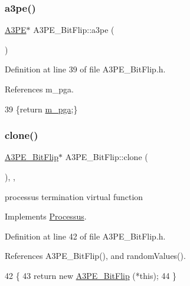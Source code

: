 \subsubsection{\texorpdfstring{a3pe()}{a3pe()}}
{\footnotesize\ttfamily \hyperlink{classA3PE}{A3\+PE}$\ast$ A3\+P\+E\+\_\+\+Bit\+Flip\+::a3pe (\begin{DoxyParamCaption}{ }\end{DoxyParamCaption})\hspace{0.3cm}{\ttfamily [inline]}}



Definition at line 39 of file A3\+P\+E\+\_\+\+Bit\+Flip.\+h.



References m\+\_\+pga.


\begin{DoxyCode}
39 \{\textcolor{keywordflow}{return} \hyperlink{classA3PE__BitFlip_ad20d7abccf27fa87b931cb77cd6b5e41}{m\_pga};\}
\end{DoxyCode}
\mbox{\label{classA3PE__BitFlip_a444f2b4fd5211e457105f13d19795211}} 
\subsubsection{\texorpdfstring{clone()}{clone()}}
{\footnotesize\ttfamily \hyperlink{classA3PE__BitFlip_1_1A3PE__BitFlip}{A3\+P\+E\+\_\+\+Bit\+Flip}$\ast$ A3\+P\+E\+\_\+\+Bit\+Flip\+::clone (\begin{DoxyParamCaption}{ }\end{DoxyParamCaption})\hspace{0.3cm}{\ttfamily [inline]}, {\ttfamily [protected]}, {\ttfamily [virtual]}}

processus termination virtual function 

Implements \hyperlink{classProcessus_aca8856f6d6d7b7e1fe941f298dcbb502}{Processus}.



Definition at line 42 of file A3\+P\+E\+\_\+\+Bit\+Flip.\+h.



References A3\+P\+E\+\_\+\+Bit\+Flip(), and random\+Values().


\begin{DoxyCode}
42                        \{
43     \textcolor{keywordflow}{return} \textcolor{keyword}{new} \hyperlink{classA3PE__BitFlip_a79aca0cefbd433bfb7f0e0cb6bc7abe1}{A3PE\_BitFlip} (*\textcolor{keyword}{this});
44   \}
\end{DoxyCode}
\mbox{\label{classA3PE__BitFlip_affa7320fb39001a6e9b5696542fe4584}} 
